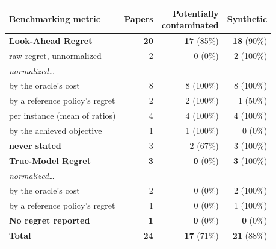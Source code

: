 \begin{tabular}{@{}lrrr@{}}
\toprule
Benchmarking metric & Papers & \makecell[r]{Potentially\\contaminated} & Synthetic \\
\midrule
\textbf{Look-Ahead Regret} & \textbf{20} & \textbf{17} (85\%) & \textbf{18} (90\%) \\
\quad raw regret, unnormalized & 2 & 0 (0\%) & 2 (100\%) \\
\quad \emph{normalized\dots} & & & \\
\qquad by the oracle's cost & 8 & 8 (100\%) & 8 (100\%) \\
\qquad by a reference policy's regret & 2 & 2 (100\%) & 1 (50\%) \\
\qquad per instance (mean of ratios) & 4 & 4 (100\%) & 4 (100\%) \\
\qquad by the achieved objective & 1 & 1 (100\%) & 0 (0\%) \\
\qquad \textbf{never stated} & 3 & 2 (67\%) & 3 (100\%) \\
\addlinespace
\textbf{True-Model Regret} & \textbf{3} & \textbf{0} (0\%) & \textbf{3} (100\%) \\
\quad \emph{normalized\dots} & & & \\
\qquad by the oracle's cost & 2 & 0 (0\%) & 2 (100\%) \\
\qquad by a reference policy's regret & 1 & 0 (0\%) & 1 (100\%) \\
\addlinespace
\textbf{No regret reported} & \textbf{1} & \textbf{0} (0\%) & \textbf{0} (0\%) \\
\midrule
\textbf{Total} & \textbf{24} & \textbf{17} (71\%) & \textbf{21} (88\%) \\
\bottomrule
\end{tabular}
